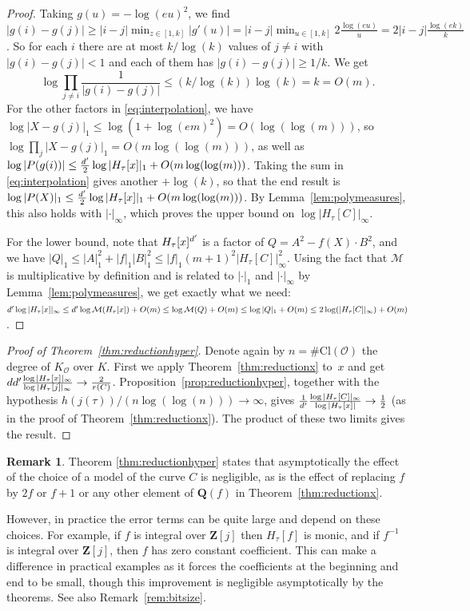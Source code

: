\documentclass{amsart}
\newcommand{\QQ}{\mathbf{Q}}
\newcommand{\ZZ}{\mathbf{Z}}
\newcommand{\F}{H_\tau[\curve]}
\newcommand{\Fx}{H_\tau[x]}
\newcommand{\Fj}{H_\tau[j]}
\newcommand{\Ff}{H_\tau[f]}
\newcommand{\Cl}{\mathrm{Cl}}
\newcommand{\mc}{\mathcal}
\newcommand{\curve}{C}
\numberwithin{equation}{section}
\theoremstyle{definition}
\newtheorem{remark}[equation]{Remark}
\begin{document}
\begin{proof}
	Taking $g(u) = -\log(eu)^2$, we find $|g(i)-g(j)| \geq |i-j|\min_{z\in[1,k]} |g'(u)|
	= |i-j|\min_{u\in[1,k]} 2\frac{\log(eu)}{u} = 2|i-j|\frac{\log(ek)}{k}$.
	So for each $i$ there are at most $k/\log(k)$ values of $j\not=i$ with $|g(i)-g(j)| < 1$
	and each of them has $|g(i)-g(j)| \geq 1/k$.
	We get 
	$$\log\prod_{j\not=i} \frac{1}{|g(i)-g(j)|}
	\leq (k/\log(k)) \log(k) = k = O(m).$$
For the other factors in \eqref{eq:interpolation},
	we have $\log|X-g(j)|_1 \leq \log(1 + \log(em)^2) = O(\log(\log(m)))$,
	so $\log \prod_{j} |X-g(j)|_1 = O(m\log(\log(m)))$,
	as well as $\log |P(g(i))| \leq \frac{\wase}{2}\log|\Fx|_1 + O(m\log(\log (m)))$.
	Taking the sum in \eqref{eq:interpolation}
	gives another $+\log(k)$, so that the end result is
	$\log |P(X)|_1 \leq \frac{\wase}{2}\log|\Fx|_1 + O(m\log(\log ( m)))$.
	By Lemma~\ref{lem:polymeasures}, this also holds with $|\cdot|_\infty$,
	which proves the upper bound on $\log|\F|_\infty$.
	
	For the lower bound, note that $\Fx^\wase$ is a factor of $Q =A^2-f(X)\cdot B^2$,
	and we have $|Q|_1 \leq |A|_1^2 + |f|_1 |B|_1^2 \leq |f|_1(m+1)^2|\F|_\infty^2$.
	Using the fact that $\mathcal{M}$ is multiplicative by definition
	and is related to $|\cdot|_1$ and $|\cdot|_\infty$ by Lemma~\ref{lem:polymeasures},
	we get exactly what we need:
	$\wase\log|\Fx|_\infty \leq  \wase\log \mathcal{M}(\Fx) + O(m)
	\leq \log\mathcal{M}(Q) + O(m)
	\leq \log|Q|_1 + O(m) \leq 2\log(|\F|_\infty) + O(m)$.
\end{proof}

\begin{proof}[Proof of Theorem~\ref{thm:reductionhyper}]
Denote again by $n=\#\Cl(\mc{O})$ the degree of $K_{\mc{O}}$ over $K$.
	First we apply Theorem~\ref{thm:reductionx} to~$x$ and get
	$d\wase\frac{\log|\Fx|_\infty}{\log|\Fj|_\infty}\rightarrow \frac{2}{r(C)}$.
	Proposition~\ref{prop:reductionhyper}, together with the hypothesis
	$h(j(\tau))/(n\log(\log(n)))\rightarrow \infty$, gives
	$\frac{1}{\wase}\frac{\log|\F|_\infty}{\log|\Fx|}\rightarrow\frac{1}{2}$
	(as in the proof of Theorem~\ref{thm:reductionx}).
	The product of these two limits gives the result.
\end{proof}

\begin{remark}\label{rem:changemodels}
	Theorem \ref{thm:reductionhyper} states
	that asymptotically the effect of the choice of a model of the curve $\curve$ is negligible,
	as is the effect of replacing $f$ by $2f$ or $f+1$ or any other element of $\QQ(f)$
	in Theorem~\ref{thm:reductionx}.

	However, in practice the error terms can be quite large and depend on these choices.
	For example, if $f$ is integral over $\ZZ[j]$ then $\Ff$ is monic, and
    if $f^{-1}$ is integral over $\ZZ[j]$, then $f$ has zero constant coefficient.
    This can make a difference in practical examples as it forces the coefficients at the beginning and end to be small,
     though this improvement is negligible asymptotically by the theorems.
     See also Remark~\ref{rem:bitsize}.
\end{remark}
\end{document}
